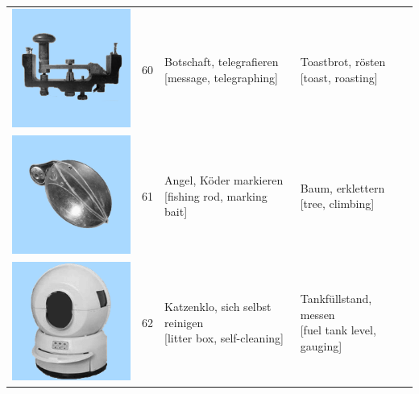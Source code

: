\documentclass[
  english,
  doc,12pt,twoside,floatsintext]{apa7}
\begin{document}
\begin{center}
\begin{ThreePartTable}
{\begin{longtable}{llll}
\includegraphics[valign=c, scale=0.23]{../materials/unfamiliar/60.png} & 60 & \makecell[l]{Botschaft, telegrafieren\\{[message, telegraphing]}} & \makecell[l]{Toastbrot, rösten\\{[toast, roasting]}}\\
\includegraphics[valign=c, scale=0.23]{../materials/unfamiliar/61.png} & 61 & \makecell[l]{Angel, Köder markieren\\{[fishing rod, marking bait]}} & \makecell[l]{Baum, erklettern\\{[tree, climbing]}}\\
\includegraphics[valign=c, scale=0.23]{../materials/unfamiliar/62.png} & 62 & \makecell[l]{Katzenklo, sich selbst reinigen\\{[litter box, self-cleaning]}} & \makecell[l]{Tankfüllstand, messen\\{[fuel tank level, gauging]}}\\

\end{longtable}}
\end{ThreePartTable}
\end{center}
\end{document}
